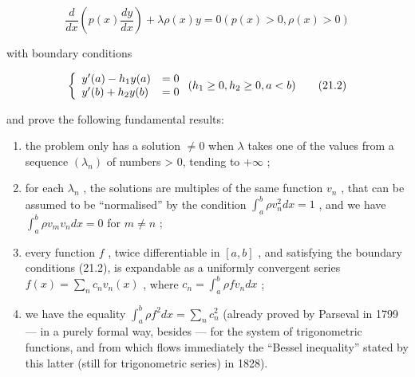\[
\frac {d}{d x} \left(p (x) \frac {d y}{d x}\right) + \lambda \rho (x) y = 0 (p (x) > 0, \rho (x) > 0)\tag{21.1}
\]

with boundary conditions

\[
\left\{ \begin{array}{l l} y ^ {\prime} (a) - h _ {1} y (a) & = 0 \\ y ^ {\prime} (b) + h _ {2} y (b) & = 0 \end{array} \right. (h _ {1} \geq 0, h _ {2} \geq 0, a <   b)\tag{21.2}
\]

and prove the following fundamental results:

\begin{enumerate}
\def\labelenumi{\arabic{enumi})}
\item
  the problem only has a solution \(\neq 0\) when \(\lambda\) takes one of the values from a sequence \((\lambda_{n})\) of numbers \textgreater{} 0, tending to \(+\infty\) ;
\item
  for each \(\lambda_{n}\) , the solutions are multiples of the same function \(v_{n}\) , that can be assumed to be ``normalised'' by the condition \(\int_{a}^{b} \rho v_{n}^{2} dx = 1\) , and we have \(\int_{a}^{b} \rho v_{m} v_{n} dx = 0\) for \(m \neq n\) ;
\item
  every function \(f\) , twice differentiable in \([a, b]\) , and satisfying the boundary conditions (21.2), is expandable as a uniformly convergent series \(f(x) = \sum_{n} c_{n} v_{n}(x)\) , where \(c_{n} = \int_{a}^{b} \rho f v_{n} dx\) ;
\item
  we have the equality \(\int_{a}^{b}\rho f^{2}dx=\sum_{n}c_{n}^{2}\) (already proved by Parseval in 1799 --- in a purely formal way, besides --- for the system of trigonometric functions, and from which flows immediately the ``Bessel inequality'' stated by this latter (still for trigonometric series) in 1828).
\end{enumerate}

